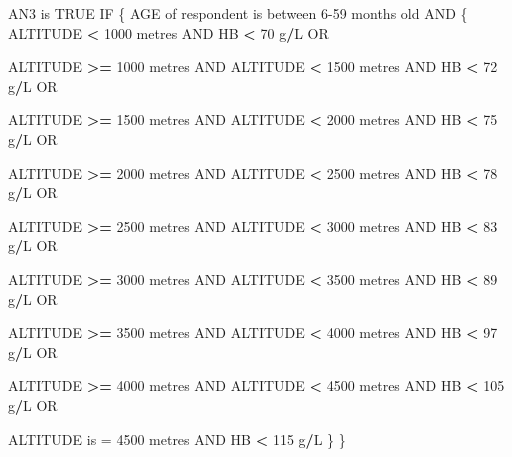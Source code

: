 \documentclass[12pt,a4paper]{article}
\newenvironment{Shaded}{\begin{snugshade}}{\end{snugshade}}
\newcommand{\DecValTok}[1]{\textcolor[rgb]{0.00,0.00,0.81}{#1}}
\newcommand{\NormalTok}[1]{#1}
\newcommand{\OperatorTok}[1]{\textcolor[rgb]{0.81,0.36,0.00}{\textbf{#1}}}
\newcommand{\OtherTok}[1]{\textcolor[rgb]{0.56,0.35,0.01}{#1}}
\newcommand{\StringTok}[1]{\textcolor[rgb]{0.31,0.60,0.02}{#1}}
\begin{document}
\begin{Shaded}
\begin{Highlighting}[]
\NormalTok{AN3 is }\OtherTok{TRUE}\NormalTok{ IF}
\NormalTok{  \{}
\NormalTok{    AGE of respondent is between }\DecValTok{6-59}\NormalTok{ months old AND}
\NormalTok{      \{}
\NormalTok{        ALTITUDE }\OperatorTok{<}\StringTok{ }\DecValTok{1000}\NormalTok{ metres AND HB }\OperatorTok{<}\StringTok{ }\DecValTok{70}\NormalTok{ g}\OperatorTok{/}\NormalTok{L OR}
     
\NormalTok{        ALTITUDE }\OperatorTok{>=}\StringTok{ }\DecValTok{1000}\NormalTok{ metres AND ALTITUDE }\OperatorTok{<}\StringTok{ }\DecValTok{1500}\NormalTok{ metres AND HB }\OperatorTok{<}\StringTok{ }\DecValTok{72}\NormalTok{ g}\OperatorTok{/}\NormalTok{L OR}
     
\NormalTok{        ALTITUDE }\OperatorTok{>=}\StringTok{ }\DecValTok{1500}\NormalTok{ metres AND ALTITUDE }\OperatorTok{<}\StringTok{ }\DecValTok{2000}\NormalTok{ metres AND HB }\OperatorTok{<}\StringTok{ }\DecValTok{75}\NormalTok{ g}\OperatorTok{/}\NormalTok{L OR}

\NormalTok{        ALTITUDE }\OperatorTok{>=}\StringTok{ }\DecValTok{2000}\NormalTok{ metres AND ALTITUDE }\OperatorTok{<}\StringTok{ }\DecValTok{2500}\NormalTok{ metres AND HB }\OperatorTok{<}\StringTok{ }\DecValTok{78}\NormalTok{ g}\OperatorTok{/}\NormalTok{L OR}

\NormalTok{        ALTITUDE }\OperatorTok{>=}\StringTok{ }\DecValTok{2500}\NormalTok{ metres AND ALTITUDE }\OperatorTok{<}\StringTok{ }\DecValTok{3000}\NormalTok{ metres AND HB }\OperatorTok{<}\StringTok{ }\DecValTok{83}\NormalTok{ g}\OperatorTok{/}\NormalTok{L OR}

\NormalTok{        ALTITUDE }\OperatorTok{>=}\StringTok{ }\DecValTok{3000}\NormalTok{ metres AND ALTITUDE }\OperatorTok{<}\StringTok{ }\DecValTok{3500}\NormalTok{ metres AND HB }\OperatorTok{<}\StringTok{ }\DecValTok{89}\NormalTok{ g}\OperatorTok{/}\NormalTok{L OR}

\NormalTok{        ALTITUDE }\OperatorTok{>=}\StringTok{ }\DecValTok{3500}\NormalTok{ metres AND ALTITUDE }\OperatorTok{<}\StringTok{ }\DecValTok{4000}\NormalTok{ metres AND HB }\OperatorTok{<}\StringTok{ }\DecValTok{97}\NormalTok{ g}\OperatorTok{/}\NormalTok{L OR}

\NormalTok{        ALTITUDE }\OperatorTok{>=}\StringTok{ }\DecValTok{4000}\NormalTok{ metres AND ALTITUDE }\OperatorTok{<}\StringTok{ }\DecValTok{4500}\NormalTok{ metres AND HB }\OperatorTok{<}\StringTok{ }\DecValTok{105}\NormalTok{ g}\OperatorTok{/}\NormalTok{L OR}

\NormalTok{        ALTITUDE is =}\StringTok{ }\DecValTok{4500}\NormalTok{ metres AND HB }\OperatorTok{<}\StringTok{ }\DecValTok{115}\NormalTok{ g}\OperatorTok{/}\NormalTok{L}
\NormalTok{      \}}
\NormalTok{  \}}
\end{Highlighting}
\end{Shaded}
\end{document}
